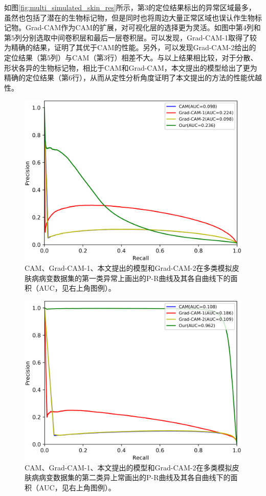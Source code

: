 如图\ref{fig:multi_simulated_skin_res}所示，第$3$的定位结果标出的异常区域最多，虽然也包括了潜在的生物标记物，但是同时也将周边大量正常区域也误认作生物标记物。Grad-CAM作为CAM的扩展，对可视化层的选择更为灵活。如图中第$4$列和第$5$列分别选取中间卷积层和最后一层卷积层。可以发现，Grad-CAM-1取得了较为精确的结果，证明了其优于CAM的性能。另外，可以发现Grad-CAM-2给出的定位结果（第$5$列）与CAM（第$3$行）相差不大。与以上结果相比较，对于分散、形状各异的生物标记物，相比于CAM和Grad-CAM，本文提出的模型给出了更为精确的定位结果（第$6$行），从而从定性分析角度证明了本文提出的方法的性能优越性。

\begin{figure}[h!]
	\centering
	\includegraphics[width=1.0\textwidth]{figure/pr_curve_multi_skin/IMAGE_NET_pr_curve.png}
	\caption{CAM、Grad-CAM-1、本文提出的模型和Grad-CAM-2在多类模拟皮肤病病变数据集的第一类异常上画出的P-R曲线及其各自曲线下的面积（AUC，见右上角图例）。} 
	\label{fig:multi_simulate_pr_curve_image_net}
\end{figure}

\begin{figure}[h!]
	\centering
	\includegraphics[width=1.0\textwidth]{figure/pr_curve_multi_skin/SKIN_pr_curve.png}
	\caption{CAM、Grad-CAM-1、本文提出的模型和Grad-CAM-2在多类模拟皮肤病病变数据集的第二类异上常画出的P-R曲线及其各自曲线下的面积（AUC，见右上角图例）。} 
	\label{fig:multi_simulate_pr_curve_skin}
\end{figure}

